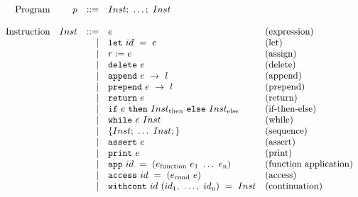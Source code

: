 \documentclass[acmsmall,screen]{acmart}
\newcommand{\Cd}[1]{\texttt{#1}}
\newcommand{\subsc}[2]{#1\textsubscript{#2}}
\begin{document}
\[
\begin{array}{rrrll}
\text{Program} & p & ::= & Inst;\ \dots ;\ Inst & \\
\\

\text{Instruction} & Inst & ::= & e & \text{(expression)} \\
&&|& \Cd{let}\ id\ =\ e & \text{(let)}\\
&&|& r := e & \text{(assign)}\\
&&|& \Cd{delete}\ e & \text{(delete)}\\
&&|& \Cd{append}\ e\ \to\ l & \text{(append)}\\
&&|& \Cd{prepend}\ e\ \to\ l & \text{(prepend)}\\
&&|& \Cd{return}\ e & \text{(return)}\\
&&|& \Cd{if}\ e\ \Cd{then}\ \subsc{Inst}{then}\
\Cd{else}\ \subsc{Inst}{else} & \text{(if-then-else)}\\
&&|& \Cd{while}\ e\ Inst & \text{(while)}\\
&&|& \{ Inst;\ \dots\ Inst;  \} & \text{(sequence)}\\
&&|& \Cd{assert}\ e & \text{(assert)}\\
&&|& \Cd{print}\ e & \text{(print)}\\
&&|& \Cd{app}\ id\ =\ (\subsc{e}{function}\ \subsc{e}{1}\ \dots\
\subsc{e}{n}) & \text{(function application)}\\
&&|& \Cd{access}\ id\ =\ (\subsc{e}{cond}\ e) & \text{(access)}\\
&&|& \Cd{withcont}\ id\ (\subsc{id}{1},\ \dots,\ \subsc{id}{n})\ =\ Inst
& \text{(continuation)}\\ 
\\
\end{array}
\]
\end{document}
